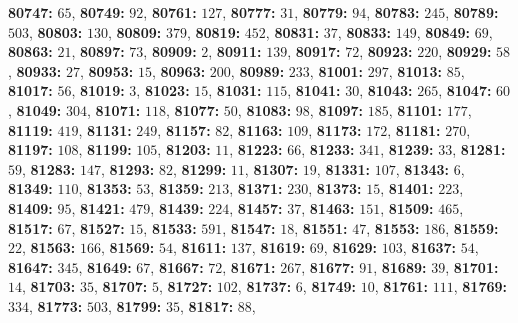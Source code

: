 \textsf{\bfseries 80747:} $65$, \textsf{\bfseries 80749:} $92$, \textsf{\bfseries 80761:} $127$, \textsf{\bfseries 80777:} $31$, \textsf{\bfseries 80779:} $94$, \textsf{\bfseries 80783:} $245$, \textsf{\bfseries 80789:} $503$, \textsf{\bfseries 80803:} $130$, \textsf{\bfseries 80809:} $379$, \textsf{\bfseries 80819:} $452$, \textsf{\bfseries 80831:} $37$, \textsf{\bfseries 80833:} $149$, \textsf{\bfseries 80849:} $69$, \textsf{\bfseries 80863:} $21$, \textsf{\bfseries 80897:} $73$, \textsf{\bfseries 80909:} $2$, \textsf{\bfseries 80911:} $139$, \textsf{\bfseries 80917:} $72$, \textsf{\bfseries 80923:} $220$, \textsf{\bfseries 80929:} $58$, \textsf{\bfseries 80933:} $27$, \textsf{\bfseries 80953:} $15$, \textsf{\bfseries 80963:} $200$, \textsf{\bfseries 80989:} $233$, \textsf{\bfseries 81001:} $297$, \textsf{\bfseries 81013:} $85$, \textsf{\bfseries 81017:} $56$, \textsf{\bfseries 81019:} $3$, \textsf{\bfseries 81023:} $15$, \textsf{\bfseries 81031:} $115$, \textsf{\bfseries 81041:} $30$, \textsf{\bfseries 81043:} $265$, \textsf{\bfseries 81047:} $60$, \textsf{\bfseries 81049:} $304$, \textsf{\bfseries 81071:} $118$, \textsf{\bfseries 81077:} $50$, \textsf{\bfseries 81083:} $98$, \textsf{\bfseries 81097:} $185$, \textsf{\bfseries 81101:} $177$, \textsf{\bfseries 81119:} $419$, \textsf{\bfseries 81131:} $249$, \textsf{\bfseries 81157:} $82$, \textsf{\bfseries 81163:} $109$, \textsf{\bfseries 81173:} $172$, \textsf{\bfseries 81181:} $270$, \textsf{\bfseries 81197:} $108$, \textsf{\bfseries 81199:} $105$, \textsf{\bfseries 81203:} $11$, \textsf{\bfseries 81223:} $66$, \textsf{\bfseries 81233:} $341$, \textsf{\bfseries 81239:} $33$, \textsf{\bfseries 81281:} $59$, \textsf{\bfseries 81283:} $147$, \textsf{\bfseries 81293:} $82$, \textsf{\bfseries 81299:} $11$, \textsf{\bfseries 81307:} $19$, \textsf{\bfseries 81331:} $107$, \textsf{\bfseries 81343:} $6$, \textsf{\bfseries 81349:} $110$, \textsf{\bfseries 81353:} $53$, \textsf{\bfseries 81359:} $213$, \textsf{\bfseries 81371:} $230$, \textsf{\bfseries 81373:} $15$, \textsf{\bfseries 81401:} $223$, \textsf{\bfseries 81409:} $95$, \textsf{\bfseries 81421:} $479$, \textsf{\bfseries 81439:} $224$, \textsf{\bfseries 81457:} $37$, \textsf{\bfseries 81463:} $151$, \textsf{\bfseries 81509:} $465$, \textsf{\bfseries 81517:} $67$, \textsf{\bfseries 81527:} $15$, \textsf{\bfseries 81533:} $591$, \textsf{\bfseries 81547:} $18$, \textsf{\bfseries 81551:} $47$, \textsf{\bfseries 81553:} $186$, \textsf{\bfseries 81559:} $22$, \textsf{\bfseries 81563:} $166$, \textsf{\bfseries 81569:} $54$, \textsf{\bfseries 81611:} $137$, \textsf{\bfseries 81619:} $69$, \textsf{\bfseries 81629:} $103$, \textsf{\bfseries 81637:} $54$, \textsf{\bfseries 81647:} $345$, \textsf{\bfseries 81649:} $67$, \textsf{\bfseries 81667:} $72$, \textsf{\bfseries 81671:} $267$, \textsf{\bfseries 81677:} $91$, \textsf{\bfseries 81689:} $39$, \textsf{\bfseries 81701:} $14$, \textsf{\bfseries 81703:} $35$, \textsf{\bfseries 81707:} $5$, \textsf{\bfseries 81727:} $102$, \textsf{\bfseries 81737:} $6$, \textsf{\bfseries 81749:} $10$, \textsf{\bfseries 81761:} $111$, \textsf{\bfseries 81769:} $334$, \textsf{\bfseries 81773:} $503$, \textsf{\bfseries 81799:} $35$, \textsf{\bfseries 81817:} $88$, 
